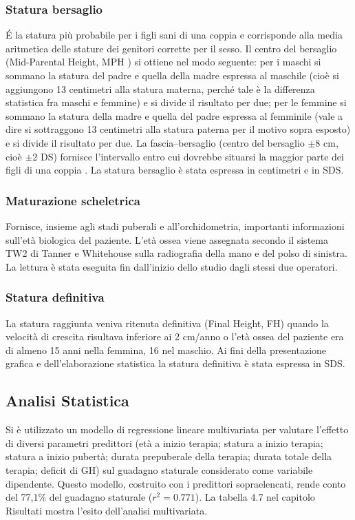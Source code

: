 \subsubsection*{Statura bersaglio}
\'E  la statura più probabile per i figli sani di una coppia e corrisponde alla media aritmetica delle stature dei genitori corrette per il sesso. Il centro del bersaglio (Mid-Parental Height, MPH ) si ottiene nel modo seguente: per i maschi si sommano la statura del padre e quella della madre espressa al maschile (cioè si aggiungono 13 centimetri alla statura materna, perché tale è la differenza statistica fra maschi e femmine) e si divide il risultato per due; per le femmine si sommano la statura della madre e quella del padre espressa al femminile (vale a dire si sottraggono 13 centimetri alla statura paterna per il motivo sopra esposto) e si divide il risultato per due. 
La fascia--bersaglio (centro del bersaglio $\pm$8 cm, cioè $\pm$2 DS) fornisce l'intervallo entro cui dovrebbe situarsi la maggior parte dei figli di una coppia \cite{tanner1990foetus}.
La statura bersaglio è stata espressa in centimetri e in SDS.


\subsubsection*{Maturazione scheletrica}
Fornisce, insieme agli stadi puberali e all'orchidometria, importanti informazioni sull'età biologica del paziente. L'età ossea viene assegnata secondo il sistema TW2 di Tanner e Whitehouse\cite{tanner1983assessment} sulla radiografia della mano e del polso di sinistra. La lettura è stata eseguita fin dall'inizio dello studio dagli stessi due operatori.


\subsubsection*{Statura definitiva}
La statura raggiunta veniva ritenuta definitiva (Final Height, FH) quando la velocità di crescita risultava inferiore ai 2 cm/anno o l'età ossea del paziente era di almeno 15 anni nella femmina, 16 nel maschio.
Ai fini della presentazione grafica e dell'elaborazione statistica la statura definitiva è stata espressa in SDS.




\subsection{Analisi Statistica}
Si è utilizzato un modello di regressione lineare multivariata per valutare l'effetto di diversi parametri predittori (età a inizio terapia; statura a inizio terapia; statura a inizio pubertà; durata prepuberale della terapia; durata totale della terapia; deficit di GH) sul guadagno staturale considerato come variabile dipendente. 
Questo modello, costruito con i predittori sopraelencati, rende conto del 77,1\% del guadagno staturale ($r^2 = 0.771$).
La tabella 4.7 nel capitolo Risultati mostra l'esito dell'analisi multivariata. 
